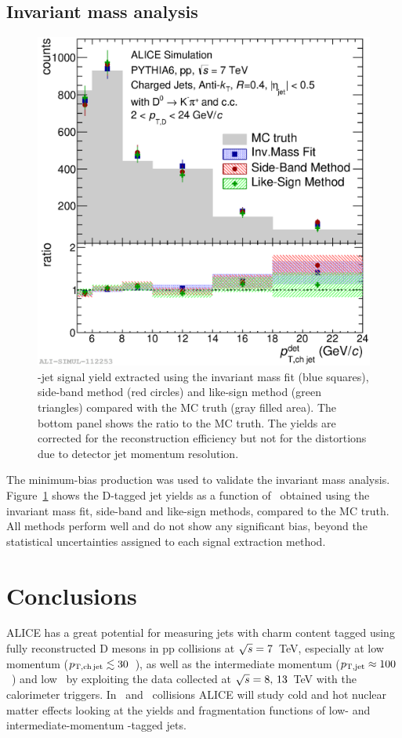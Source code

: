 \documentclass[a4paper]{jpconf}
\begin{document}
\subsection{Invariant mass analysis}
\begin{figure}[tb]
\includegraphics[width=.50\textwidth]{img/HQ16_Simulation_MethodComparison}\hspace{1pc}%
\begin{minipage}[b]{.50\textwidth}\caption{\label{fig:HQ16_Simulation_MethodComparison}\Dzero-jet signal yield extracted using the invariant mass fit (blue squares), side-band method (red circles) and like-sign method (green triangles)
compared with the MC truth (gray filled area). The bottom panel shows the ratio to the MC truth. The yields are corrected for the reconstruction efficiency but not for the distortions due to detector jet momentum resolution.}
\end{minipage}
\end{figure}

The minimum-bias production was used to validate the invariant mass analysis. 
Figure~\ref{fig:HQ16_Simulation_MethodComparison} shows the D-tagged jet yields as a function of \ptchjetdet\ obtained using the invariant mass fit, 
side-band and like-sign methods, compared to the MC truth. All methods perform well and do not show any significant bias, beyond the statistical uncertainties assigned to each signal extraction method.

\section{Conclusions}
ALICE has a great potential for measuring jets with charm content tagged using fully reconstructed D mesons in pp collisions at $\sqrt{s}=7$~TeV, especially at low momentum ($p_{\mathrm{T,ch\, jet}} \lesssim 30$~\GeVc),
as well as the intermediate momentum ($p_{\mathrm{T,jet}}\approx100$~\GeVc) and
low \ptd\ by exploiting the data collected at $\sqrt{s}=8,\,13$~TeV with the calorimeter triggers.
In \PbPb\ and \pPb\ collisions ALICE will study cold and hot nuclear matter effects
looking at the yields and fragmentation functions of low- and intermediate-momentum \Dzero-tagged jets.
\end{document}
